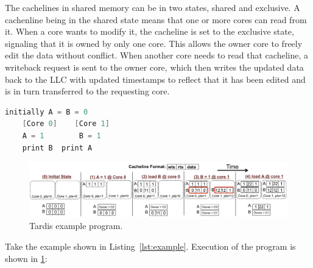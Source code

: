 \documentclass[12pt]{article}
\begin{document}
	
	The cachelines in shared memory can be in two states, shared and exclusive. A cachenline being in the shared state means that one or more cores can read from it. When a core wants to modify it, the cacheline is set to the exclusive state, signaling that it is owned by only one core. This allows the owner core to freely edit the data without conflict. When another core needs to read that cacheline, a writeback request is sent to the owner core, which then writes the updated data back to the LLC with updated timestamps to reflect that it has been edited and is in turn transferred to the requesting core.
	
	
	
	
	
	
	\vspace{-.1in}
	\begin{lstlisting}[language=C,label={lst:example},caption={Example 
	Program}]
	initially A = B = 0
	[Core 0]	[Core 1]
	A = 1		 B = 1
	print B	 print A
	\end{lstlisting}
	
	
	\begin{figure}
		\centering
		\includegraphics[width=0.95\columnwidth]{figs/example.pdf}
		\caption{ Tardis example program.}
		\label{fig:example}
	\end{figure}
	
	
	Take the example shown in Listing~\ref{lst:example}. Execution of the program is shown in \cref{fig:example}:
	
\end{document}
